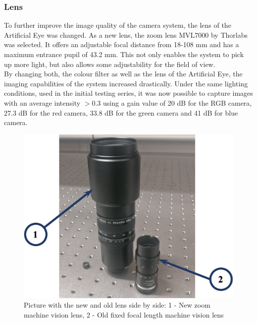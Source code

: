 \subsubsection{Lens}
To further improve the image quality of the camera system, the lens of the Artificial Eye was changed. As a new lens, the zoom lens MVL7000 by Thorlabs was selected. It offers an adjustable focal distance from 18-108 mm and has a maximum entrance pupil of 43.2 mm. This not only enables the system to pick up more light, but also allows some adjustability for the field of view.\\

By changing both, the colour filter as well as the lens of the Artificial Eye, the imaging capabilities of the system increased drastically. Under the same lighting conditions, used in the initial testing series, it was now possible to capture images with an average intensity $>$0.3 using a gain value of 20 dB for the RGB camera, 27.3 dB for the red camera, 33.8 dB for the green camera and 41 dB for blue camera.

\begin{figure}
\begin{center}
\includegraphics[width=12cm]{Pictures/LensComp}
\caption[Picture with the new and old lens side by side]{Picture with the new and old lens side by side: 1 - New zoom machine vision lens, 2 - Old fixed focal length machine vision lens}
\label{LensComp}
\end{center}
\end{figure}






